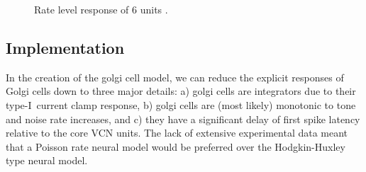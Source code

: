 \begin{figure}[ht!]
  \centering
\caption{Rate level response of 6 units \citep[from~Fig.~2]{GhoshalKim:1997}. %
}\label{fig:GolgiKimFig2}
\end{figure}


\clearpage
\subsection{Implementation}

In the creation of the golgi cell model, we can reduce the explicit
responses of Golgi cells down to three major details: a) golgi cells
are integrators due to their type-I~current clamp response, b) golgi
cells are (most likely) monotonic to tone and noise rate increases,
and c) they have a significant delay of first spike latency relative
to the core VCN units. The lack of extensive experimental data meant
that a Poisson rate neural model would be preferred over the
Hodgkin-Huxley type neural model.

